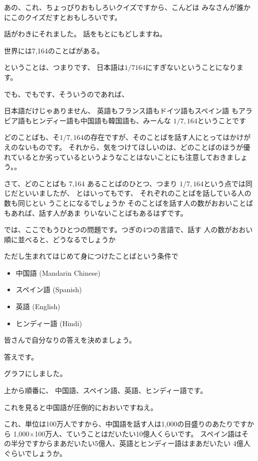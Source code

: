 \documentclass[12pt]{jlreq}
\begin{document}
あの、これ、ちょっぴりおもしろいクイズですから、こんどは
みなさんが誰かにこのクイズだすとおもしろいです。

話がわきにそれました。
話をもとにもどしますね。

\hrulefill

世界には7,164のことばがある。

ということは、つまりです、
日本語は${1}/{7164}$にすぎないということになります。

でも、でもです、そういうのであれば、

日本語だけじゃありません、
英語もフランス語もドイツ語もスペイン語
もアラビア語もヒンディー語も中国語も韓国語も、みーんな
$1/7,164$ということです

どのことばも、そ$1/7,164$の存在ですが、そのことばを話す人にとってはかけがえのないものです。
それから、気をつけてほしいのは、どのことばのほうが優れているとか劣っているというようなことはないことにも注意しておきましょう。。

\hrulefill

さて、どのことばも 7,164 あることばのひとつ、つまり
${1}/{7,164}$という点では同じだといいましたが、
とはいってもです、
それぞれのことばを話している人の数も同じとい
うことになるでしょうか
そのことばを話す人の数がおおいことばもあれば、話す人があま
りいないことばもあるはずです。

\hrulefill

では、ここでもうひとつの問題です。つぎの4つの言語で、話す
人の数がおおい順に並べると、どうなるでしょうか

ただし生まれてはじめて身につけたことばという条件で

\begin{itemize}
 \item  中国語 (Mandarin Chinese)
 \item  スペイン語 (Spanish)
 \item  英語 (English)
 \item  ヒンディー語 (Hindi)
\end{itemize}

皆さんで自分なりの答えを決めましょう。

\hrulefill

答えです。

グラフにしました。

上から順番に、
中国語、スペイン語、英語、ヒンディー語です。

これを見ると中国語が圧倒的におおいですねえ。

これ、単位は100万人ですから、中国語を話す人は1,000の目盛りのあたりですから
1,000$\times$100万人、ていうことはだいたい10億人くらいです。
スペイン語はその半分ですからまあだいたい5億人、英語とヒンディー語はまあだいたい
4億人ぐらいでしょうか。
\end{document}
